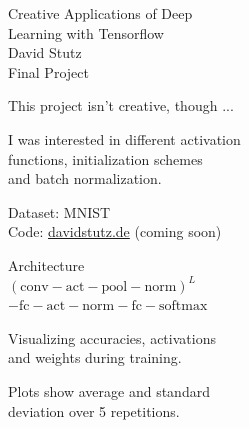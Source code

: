 \documentclass{beamer}
\title{}
\author{}
\date{}
\begin{document}
{\color{RWTHgrey}
	\begin{frame}[t]{}{}%
		\vfill
    		\begin{center}
    			{\LARGE Creative Applications of Deep\\[2px] Learning with Tensorflow}\\[6px]
    			{\Large\color{RWTHorange} David Stutz}\\[6px]
    			{\large Final Project}
    		\end{center}
    		\vfill
	\end{frame}
	\begin{frame}[t]{}{}%
		\vfill
    		\begin{center}
    			{\Large This project isn't creative, though ...}
    		\end{center}
    		\pause
    		\begin{center}
    			{\Large I was interested in different activation}\\[6px]
    			{\Large functions, initialization schemes}\\[6px]
    			{\Large and batch normalization.}
    		\end{center}
    		\vfill
	\end{frame}
	\begin{frame}[t]{}{}%
		\vfill
		\begin{center}
    			{\Large Dataset: MNIST}\\[6px]
    			{\Large Code: \url{davidstutz.de} (coming soon)}
    		\end{center}
    		\pause
    		\begin{center}
    			{\Large Architecture}\\[6px]
    			{\large $(\text{conv} - \text{act} - \text{pool} - \text{norm})^L$}\\[6px]
    			{\large $- \text{fc} - \text{act} - \text{norm} - \text{fc} - \text{softmax}$}
    		\end{center}
    		\vfill
	\end{frame}
	\begin{frame}[t]{}{}%
		\vfill
    		\begin{center}
    			{\Large Visualizing accuracies, activations}\\[6px]
    			{\Large and weights during training.}
    		\end{center}
    		\pause
    		\begin{center}
    			{\large Plots show average and standard}\\[6px]
    			{\large deviation over 5 repetitions.}
    		\end{center}
    		\vfill
	\end{frame}
	
}
\end{document}
